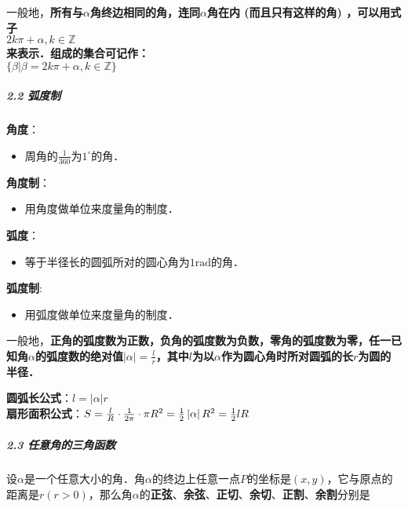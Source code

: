 \documentclass[
]{article}
\begin{document}
一般地，\textbf{所有与\(\alpha\)角终边相同的角，连同\(\alpha\)角在内
(而且只有这样的角) ，可以用式子\\
\(2k\pi + \alpha, k \in \mathbb Z\)\\
来表示．组成的集合可记作：\\
\( \{\beta | \beta = 2k\pi + \alpha, k \in \mathbb Z \} \)}

\hypertarget{22--ux5f27ux5ea6ux5236}{%
\subparagraph{2.2 弧度制}\label{22--ux5f27ux5ea6ux5236}}

\textbf{角度}：

\begin{itemize}
\item
  周角的\(\frac{1}{360}\)为\(1^{\circ}\)的角．
\end{itemize}

\textbf{角度制}：

\begin{itemize}
\item
  用角度做单位来度量角的制度．
\end{itemize}

\textbf{弧度}：

\begin{itemize}
\item
  等于半径长的圆弧所对的圆心角为\(1 \mathrm{rad}\)的角．
\end{itemize}

\textbf{弧度制}:

\begin{itemize}
\item
  用弧度做单位来度量角的制度．
\end{itemize}

一般地，\textbf{正角的弧度数为正数，负角的弧度数为负数，零角的弧度数为零，任一已知角\(\alpha\)的弧度数的绝对值\(\left| \alpha \right|=  \frac{l}{r}\)，其中\(l\)为以\(\alpha\)作为圆心角时所对圆弧的长\(r\)为圆的半径．}

\textbf{圆弧长公式}：\(l =\left| \alpha \right| r\)\\
\textbf{扇形面积公式}：\(S = {l \over R} \cdot {1 \over 2\pi} \cdot \pi R^2 = {1 \over 2}\left| \alpha \right| R^2 ={1 \over 2}lR\)\\

\hypertarget{23--ux4efbux610fux89d2ux7684ux4e09ux89d2ux51fdux6570}{%
\subparagraph{2.3
任意角的三角函数}\label{23--ux4efbux610fux89d2ux7684ux4e09ux89d2ux51fdux6570}}

设\(\alpha\)是一个任意大小的角．角\(\alpha\)的终边上任意一点\(P\)的坐标是\((x,y)\)，它与原点的距离是\(r(r >0)\)，那么角\(\alpha\)的\textbf{正弦}、\textbf{余弦}、\textbf{正切}、\textbf{余切}、\textbf{正割}、\textbf{余割}分别是
\end{document}
